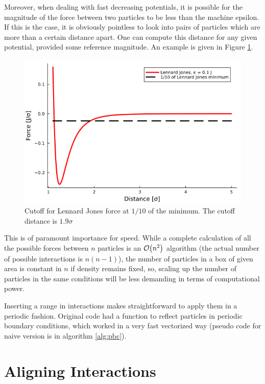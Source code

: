 \documentclass[../../master_thesis_np.tex]{subfiles}
\begin{document}
	Moreover, when dealing with fast decreasing potentials, it is possible for the magnitude of the force between two particles to be less than the machine epsilon. If this is the case, it is obviously pointless to look into pairs of particles which are more than a certain distance apart. One can compute this distance for any given potential, provided some reference magnitude. An example is given in Figure \ref{fig:force_zero}.
	\begin{figure}[htp]
		\centering
		\includegraphics[width=\textwidth]{lj_zero.png}
		\caption{Cutoff for Lennard Jones force at $1/10$ of the minimum. The cutoff distance is $1.9\sigma$}
		\label{fig:force_zero}
	\end{figure}
	This is of paramount importance for speed. While a complete calculation of all the possible forces between $n$ particles is an $\order{n^2}$ algorithm (the actual number of possible interactions is $n(n-1)$), the number of particles in a box of given area is constant in $n$ if density remains fixed, so, scaling up the number of particles in the same conditions will be less demanding in terms of computational power.
	
	Inserting a range in interactions makes straightforward to apply them in a periodic fashion. Original code had a function to reflect particles in periodic boundary conditions, which worked in a very fast vectorized way (pseudo code for naive version is in algorithm \ref{alg:pbc}).
	
	\section{Aligning Interactions}
\end{document}
